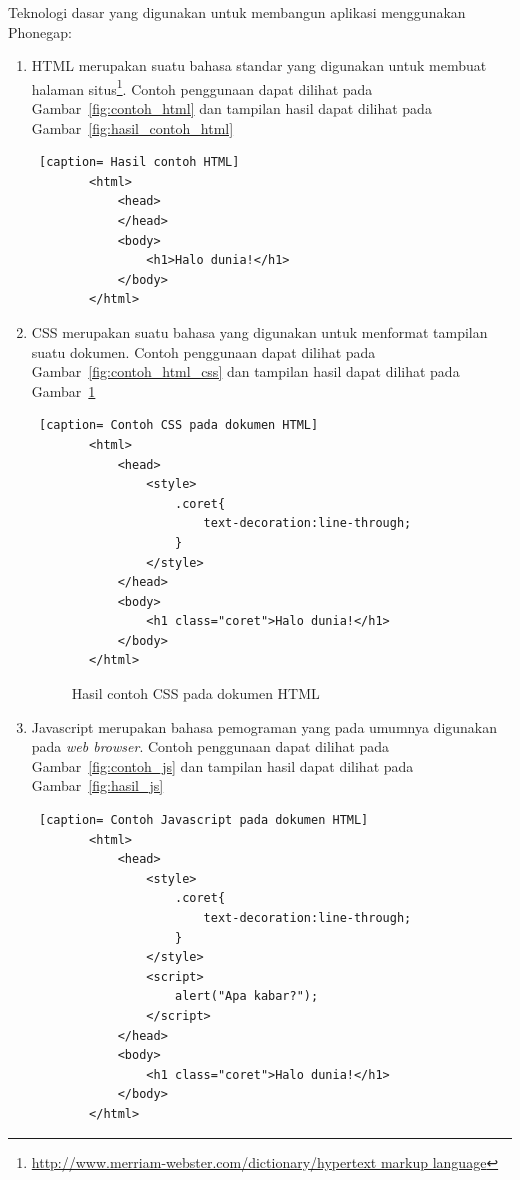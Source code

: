 Teknologi dasar yang digunakan untuk membangun aplikasi menggunakan Phonegap:
\begin{enumerate}
	\item HTML merupakan suatu bahasa standar yang digunakan untuk membuat halaman situs\footnote{\url{http://www.merriam-webster.com/dictionary/hypertext markup language}}. Contoh penggunaan dapat dilihat pada Gambar~\ref{fig:contoh_html} dan tampilan hasil dapat dilihat pada Gambar~\ref{fig:hasil_contoh_html}
	
	\begin{lstlisting} [caption= Hasil contoh HTML]
		<html>
			<head>
			</head>
			<body>
				<h1>Halo dunia!</h1>
			</body>
		</html>
	\end{lstlisting}
		
	\item CSS merupakan suatu bahasa yang digunakan untuk menformat tampilan suatu dokumen. Contoh penggunaan dapat dilihat pada Gambar~\ref{fig:contoh_html_css} dan tampilan hasil dapat dilihat pada Gambar~\ref{fig:hasil_contoh_html_css}
	
	\begin{lstlisting} [caption= Contoh CSS pada dokumen HTML]
		<html>
			<head>
				<style>
					.coret{
						text-decoration:line-through;
					}
				</style>
			</head>
			<body>
				<h1 class="coret">Halo dunia!</h1>
			</body>
		</html>
	\end{lstlisting}
		
		\begin{figure}[h]
		\centering
		\caption[Hasil contoh CSS pada dokumen HTML]{Hasil contoh CSS pada dokumen HTML} 
		\label{fig:hasil_contoh_html_css}
		\end{figure}
		
	\item Javascript merupakan bahasa pemograman yang pada umumnya digunakan pada \textit{web browser}. Contoh penggunaan dapat dilihat pada Gambar~\ref{fig:contoh_js} dan tampilan hasil dapat dilihat pada Gambar~\ref{fig:hasil_js}
	
	\begin{lstlisting} [caption= Contoh Javascript pada dokumen HTML]
		<html>
			<head>
				<style>
					.coret{
						text-decoration:line-through;
					}
				</style>
				<script>
					alert("Apa kabar?");
				</script>
			</head>
			<body>
				<h1 class="coret">Halo dunia!</h1>
			</body>
		</html>
	\end{lstlisting}
	
\end{enumerate}

